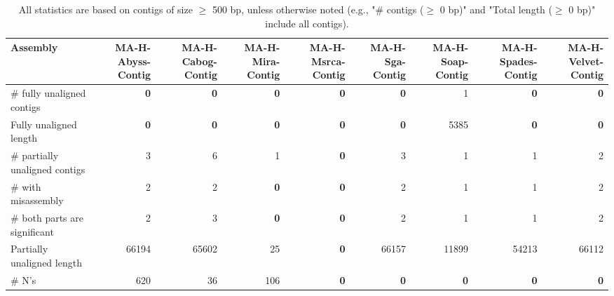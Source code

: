 \documentclass[12pt,a4paper]{article}
\begin{document}
\begin{table}[ht]
\begin{center}
\caption{All statistics are based on contigs of size $\geq$ 500 bp, unless otherwise noted (e.g., "\# contigs ($\geq$ 0 bp)" and "Total length ($\geq$ 0 bp)" include all contigs).}
\begin{tabular}{|l*{8}{|r}|}
\hline
Assembly & MA-H-Abyss-Contig & MA-H-Cabog-Contig & MA-H-Mira-Contig & MA-H-Msrca-Contig & MA-H-Sga-Contig & MA-H-Soap-Contig & MA-H-Spades-Contig & MA-H-Velvet-Contig \\ \hline
\# fully unaligned contigs & {\bf 0} & {\bf 0} & {\bf 0} & {\bf 0} & {\bf 0} & 1 & {\bf 0} & {\bf 0} \\ \hline
Fully unaligned length & {\bf 0} & {\bf 0} & {\bf 0} & {\bf 0} & {\bf 0} & 5385 & {\bf 0} & {\bf 0} \\ \hline
\# partially unaligned contigs & 3 & 6 & 1 & {\bf 0} & 3 & 1 & 1 & 2 \\ \hline
\hspace{5mm}\# with misassembly & 2 & 2 & {\bf 0} & {\bf 0} & 2 & 1 & 1 & 2 \\ \hline
\hspace{5mm}\# both parts are significant & 2 & 3 & {\bf 0} & {\bf 0} & 2 & 1 & 1 & 2 \\ \hline
Partially unaligned length & 66194 & 65602 & 25 & {\bf 0} & 66157 & 11899 & 54213 & 66112 \\ \hline
\# N's & 620 & 36 & 106 & {\bf 0} & {\bf 0} & {\bf 0} & {\bf 0} & {\bf 0} \\ \hline
\end{tabular}
\end{center}
\end{table}
\end{document}
